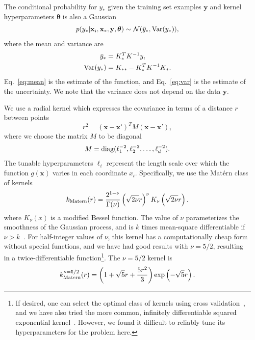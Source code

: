 \documentclass[prd,aps,letter,twocolumn,floatfix,notitlepage,nofootinbib]{revtex4-1}
\def\bx{\mathbf{x}}
\def\by{\mathbf{y}}
\def\btheta{\boldsymbol{\theta}}
\begin{document}
The conditional probability for $y_*$ given the training set examples $\by$ and kernel hyperparameters $\btheta$ is also a Gaussian
\begin{equation}
p(y_* | \bx_i, \bx_*, \by, \btheta) \sim \mathcal{N}(\bar y_*, {\rm Var}(y_*)),
\end{equation}
where the mean and variance are
\begin{align}
\label{eq:mean}
\bar y_* &= K_*^T K^{-1} y, \\
\label{eq:var}
{\rm Var}(y_*) &= K_{**} - K_*^T K^{-1} K_*.
\end{align}
Eq.~\eqref{eq:mean} is the estimate of the function, and Eq.~\eqref{eq:var} is the estimate of the uncertainty. We note that the variance does not depend on the data $\by$.

We use a radial kernel which expresses the covariance in terms of a distance $r$ between points
\begin{equation}
r^2 = (\bx - \bx')^T M (\bx - \bx'),
\end{equation}
where we choose the matrix $M$ to be diagonal
\begin{equation}
M = {\rm diag}(\ell_1^{-2}, \ell_2^{-2}, \dots, \ell_d^{-2}).
\end{equation}
The tunable hyperparameters $\ell_i$ represent the length scale over which the function $g(\bx)$ varies in each coordinate $x_i$. Specifically, we use the Mat\'{e}rn class of kernels
\begin{equation}
k_{\rm Matern}(r) = \frac{2^{1-\nu}}{\Gamma(\nu)} \left(\sqrt{2\nu} r\right)^\nu K_\nu \left(\sqrt{2\nu} r \right).
\end{equation}
where $K_\nu(x)$ is a modified Bessel function. The value of $\nu$ parameterizes the smoothness of the Gaussian process, and is $k$ times mean-square differentiable if $\nu>k$~\cite{RasmussenWilliams2006}. For half-integer values of $\nu$, this kernel has a computationally cheap form without special functions, and we have had good results with $\nu=5/2$, resulting in a twice-differentiable function\footnote{If desired, one can select the optimal class of kernels using cross validation~\cite{RasmussenWilliams2006}, and we have also tried the more common, infinitely differentiable squared exponential kernel~\cite{RasmussenWilliams2006}. However, we found it difficult to reliably tune its hyperparameters for the problem here.}. The $\nu=5/2$ kernel is
\begin{equation}
k_{\rm Matern}^{\nu=5/2}(r) = \left(1+\sqrt{5}r + \frac{5r^2}{3}\right) \exp\left(-\sqrt{5}r\right).
\end{equation}
\end{document}
